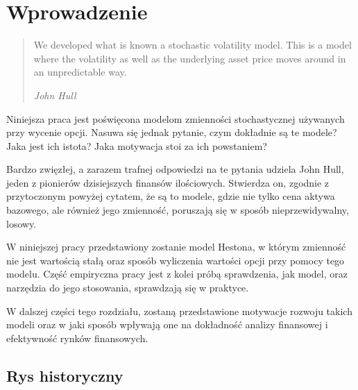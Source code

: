\documentclass{pracamgr}
\begin{document}
\cleardoublepage
{}
{}
\tableofcontents


\chapter{Wprowadzenie}
\label{chap:introduction}
\begin{quote}

  We developed what is known a stochastic volatility model. 
  This is a model where the volatility as well as the 
  underlying asset price moves around in an unpredictable way.

\raggedleft\slshape John Hull 
\end{quote}
Niniejsza praca jest poświęcona modelom zmienności stochastycznej używanych przy wycenie opcji. 
Nasuwa się jednak pytanie, czym dokładnie są te modele? 
Jaka jest ich istota? Jaka motywacja stoi za ich powstaniem?


Bardzo zwięzłej, a zarazem trafnej odpowiedzi na te pytania udziela John Hull, 
jeden z pionierów dzisiejszych finansów ilościowych. Stwierdza on, zgodnie z przytoczonym 
powyżej cytatem, że są to modele, gdzie nie tylko cena aktywa bazowego, ale również jego zmienność, 
poruszają się w sposób nieprzewidywalny, losowy. 

W niniejszej pracy przedstawiony zostanie model Hestona, w którym zmienność nie jest wartością stałą 
oraz sposób wyliczenia wartości opcji przy pomocy tego modelu.
Część empiryczna pracy jest z kolei próbą sprawdzenia, jak model, oraz narzędzia do jego stosowania, sprawdzają się w praktyce.

W dalszej części tego rozdziału, zostaną przedstawione motywacje rozwoju takich modeli oraz w jaki sposób
wpływają one na dokładność analizy finansowej i efektywność rynków finansowych. 


\section{Rys historyczny} %
\label{sec:rys_historyczny}
\end{document}
